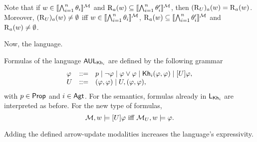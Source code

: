 
Note that if $w \in \llbracket \bigwedge_{i=1}^n \theta_i \rrbracket^{\mathcal{M}}$ and $\operatorname{R}_a(w) \subseteq \llbracket \bigwedge_{i=1}^n \theta'_i \rrbracket^{\mathcal{M}}$, then $(\operatorname{R}_{{U}})_a(w) = \operatorname{R}_a(w)$. Moreover, $(\operatorname{R}_{{U}})_a(w) \neq \emptyset$ iff $w \in \llbracket \bigwedge_{i=1}^n \theta_i \rrbracket^{\mathcal{M}}$, $\operatorname{R}_a(w) \subseteq \llbracket \bigwedge_{i=1}^n \theta'_i \rrbracket^{\mathcal{M}}$ and $\operatorname{R}_a(w) \neq \emptyset$.

\medskip

Now, the language.

\medskip

\begin{definition}\label{def:arrowsyntax}\label{def:arrowupdate}
Formulas of the language $\mathsf{AUL}_{{\sf Kh}_i}$ are defined by the following grammar
\[
\begin{array}{lcl}
\varphi & ::= & p \mid \neg\varphi \mid \varphi\vee\varphi \mid
{\sf Kh}_i(\varphi,\varphi) \mid [U]\varphi, \\
U & ::= & (\varphi,\varphi) \mid U,(\varphi,\varphi),
\end{array}
\]
with $p \in {\rm \sf Prop}$ and $i\in{\rm \sf Agt}$. 
For the semantics, formulas already in $\mathsf{L}_{{\sf Kh}_i}$ are interpreted as before. For the new type of formulas, 
\[
	\mathcal{M},w \models [U]\varphi \mbox{ iff } \mathcal{M}_{{U}},w \models \varphi.
\]
\end{definition}



Adding the defined arrow-update modalities increases the language's expressivity.

